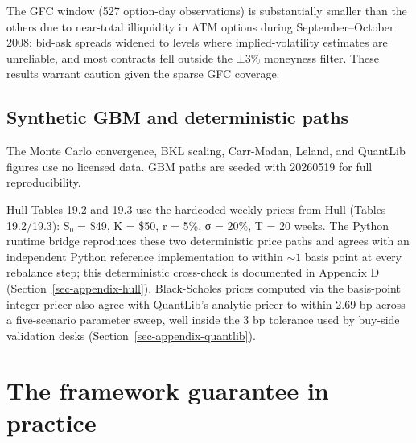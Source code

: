 \documentclass[
  11pt,
  letterpaper,
  DIV=12,
  numbers=noendperiod]{scrartcl}
\numberwithin{equation}{section}
\numberwithin{figure}{section}
\numberwithin{table}{section}
\let\quantproofsoldsection\section
\renewcommand{\section}{\clearpage\quantproofsoldsection}
\begin{document}
The GFC window (527 option-day observations) is substantially smaller
than the others due to near-total illiquidity in ATM options during
September--October 2008: bid-ask spreads widened to levels where
implied-volatility estimates are unreliable, and most contracts fell
outside the ±3\% moneyness filter. These results warrant caution given
the sparse GFC coverage.

\subsection{Synthetic GBM and deterministic
paths}\label{synthetic-gbm-and-deterministic-paths}

The Monte Carlo convergence, BKL scaling, Carr-Madan, Leland, and
QuantLib figures use no licensed data. GBM paths are seeded with
20260519 for full reproducibility.

Hull Tables 19.2 and 19.3 use the hardcoded weekly prices from Hull
 (Tables 19.2/19.3): S₀ = \$49, K = \$50,
r = 5\%, σ = 20\%, T = 20 weeks. The Python runtime bridge reproduces
these two deterministic price paths and agrees with an independent
Python reference implementation to within \(\sim 1\) basis point at
every rebalance step; this deterministic cross-check is documented in
Appendix D (Section~\ref{sec-appendix-hull}). Black-Scholes prices
computed via the basis-point integer pricer also agree with QuantLib's
analytic pricer to within 2.69 bp across a five-scenario parameter
sweep, well inside the 3 bp tolerance used by buy-side validation desks
(Section~\ref{sec-appendix-quantlib}).

\section{The framework guarantee in practice}\label{sec-results}
\end{document}
